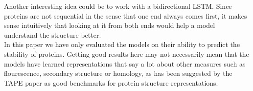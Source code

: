\noindent
Another interesting idea could be to work with a bidirectional LSTM. Since proteins are not sequential in the sense that one end always comes first, it makes sense intuitively that looking at it from both ends would help a model understand the structure better.\\

\noindent
In this paper we have only evaluated the models on their ability to predict the stability of proteins. Getting good results here may not necessarily mean that the models have learned representations that say a lot about other measures such as flourescence, secondary structure or homology, as has been suggested by the TAPE paper\cite{tape} as good benchmarks for protein structure representations.